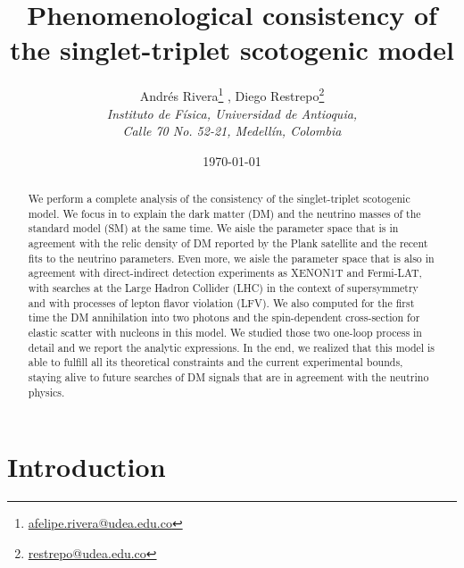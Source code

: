 \documentclass[12pt,letterpaper]{article}
\title{
Phenomenological consistency of the singlet-triplet scotogenic model
}
\author{ 
    Andrés Rivera\footnote{\href{mailto:afelipe.rivera@udea.edu.co}{afelipe.rivera@udea.edu.co}}
   , Diego Restrepo\footnote{\href{mailto:restrepo@udea.edu.co}{restrepo@udea.edu.co}}
    \\
\textit{\small  Instituto de F\'{i}sica, Universidad de Antioquia,} \\
\textit{\small  Calle 70 No. 52-21, Medell\'{i}n, Colombia}
}
\date{\small \today}
\begin{document}
\maketitle
\begin{abstract}
We perform a complete analysis of the consistency of the singlet-triplet scotogenic model. We focus in to explain the dark matter (DM) and the neutrino masses of the standard model (SM) at the same time.
We aisle the parameter space that is in agreement with the relic density of DM reported by the Plank satellite and the recent fits to the neutrino parameters. 
Even more, we aisle the parameter space that is also in agreement with direct-indirect detection experiments as XENON1T and Fermi-LAT, with searches at the Large Hadron Collider (LHC) in the context of supersymmetry and with processes of lepton flavor violation (LFV).
We also computed for the first time the DM annihilation into two photons and the spin-dependent cross-section for elastic scatter with nucleons in this model. We studied those two one-loop process in detail and we report the analytic expressions.
In the end, we realized that this model is able to fulfill all its theoretical constraints and the current experimental bounds, staying alive to future searches of DM signals that are in agreement with the neutrino physics. 
  

\end{abstract}



\section{Introduction}
\end{document}
